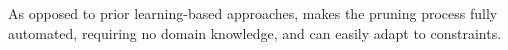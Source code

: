 As opposed to prior learning-based approaches, \llm makes the pruning process fully automated, requiring no domain knowledge, and can easily adapt to constraints.




